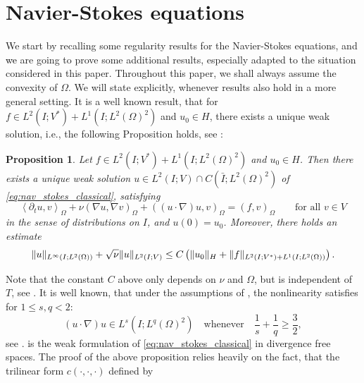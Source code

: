 \documentclass{m2an}
\newcommand\blue[1]{\textcolor{black}{#1}}
\newtheorem{proposition}[theorem]{Proposition}
\newcommand{\Oprod}[1]{\left( #1 \right)_{\Omega}}
\newcommand{\Opair}[1]{\left\langle #1 \right\rangle_{\Omega}}
\newcommand{\LinfLtwo}{L^\infty(I;L^2(\Omega))}
\newcommand{\LtwoV}{L^2(I;V)}
\begin{document}
\section{Navier-Stokes equations}\label{sec:NSE}
We start by recalling some regularity results for the Navier-Stokes equations,
and \blue{we} are going to prove some additional results, especially adapted to the situation considered in
this paper.
Throughout this paper, we shall always assume the convexity of $\Omega$. We will state explicitly, whenever
results also hold in a more general setting.
It is a well known result, that for $f \in L^2(I;V^*)+L^1(I;L^2(\Omega)^2)$
and $u_0 \in H$, there exists a unique weak solution,
i.e., the following Proposition holds, see \cite[Chapter 3, Theorem 3.1 \& Remark 3.1]{Temam1977}:
\begin{proposition}\label{prop:navier_stokes_solvability}
  Let
  $f \in L^2(I;V^*) + L^1(I;L^2(\Omega)^2)$ and $u_0 \in H$. Then there exists a unique weak solution 
  $u \in L^2(I;V)\cap C(\bar I;L^2(\Omega)^2)$ of \eqref{eq:nav_stokes_classical}, satisfying
  \begin{equation}\label{eq:nav_stokes_weak}
    \Opair{ \partial_t u,v} + \nu \Oprod{\nabla u, \nabla v} + \Oprod{(u\cdot \nabla)u,v} 
    = \Oprod{f,v} 
    \qquad \text{for all } v \in V
  \end{equation}
  in the sense of distributions on $I$,
  and $u(0) = u_0$. Moreover, there holds an estimate
  \begin{equation*}
    \|u\|_{\LinfLtwo} + \blue{\sqrt{\nu}} \|u\|_{\LtwoV} 
    \le C \left(\|u_0\|_H + \|f\|_{L^2(I;V^*) + L^1(I;L^2(\Omega))}\right).
  \end{equation*}
\end{proposition}
Note that the constant $C$ above only depends on $\nu$ and $\Omega$, but is independent of $T$,
see \cite[Theorems V.1.4.2, V.1.5.3, V.3.1.1]{Sohr2001}.
It is well known, that under the assumptions of , the 
nonlinearity satisfies for $1 \le s,q < 2$:
\begin{equation}\label{eq:nonlinearity_regularity}
  (u\cdot \nabla) u \in L^s(I;L^q(\Omega)^2) \quad \text{whenever} \quad
  \frac{1}{s} + \frac{1}{q} \ge \frac{3}{2},
\end{equation}
see \cite[Lemma V.1.2.1]{Sohr2001}.
 is the weak formulation of \eqref{eq:nav_stokes_classical} in divergence free spaces.
The proof of the above proposition relies heavily on the fact, that the trilinear form $c(\cdot,\cdot,\cdot)$
defined by
\end{document}
